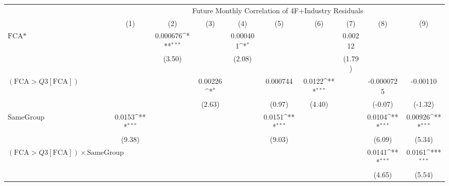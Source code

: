 {
\def\sym#1{\ifmmode^{#1}\else\(^{#1}\)\fi}
\begin{tabular}{l*{9}{c}}
\hline\hline
                &\multicolumn{9}{c}{Future Monthly Correlation of 4F+Industry Residuals}                                                                                                   \\\cmidrule(lr){2-10}
                &\multicolumn{1}{c}{(1)}         &\multicolumn{1}{c}{(2)}         &\multicolumn{1}{c}{(3)}         &\multicolumn{1}{c}{(4)}         &\multicolumn{1}{c}{(5)}         &\multicolumn{1}{c}{(6)}         &\multicolumn{1}{c}{(7)}         &\multicolumn{1}{c}{(8)}         &\multicolumn{1}{c}{(9)}         \\
\hline
$ \text{FCA*} $ &                  & 0.000676\sym{***}&                  & 0.000401\sym{*}  &                  &                  &  0.00212         &                  &                  \\
                &                  &   (3.50)         &                  &   (2.08)         &                  &                  &   (1.79)         &                  &                  \\
[1em]
 $ (\text{FCA} > Q3[\text{FCA}]) $ &                  &                  &  0.00226\sym{*}  &                  & 0.000744         &   0.0122\sym{***}&                  &-0.0000725         & -0.00110         \\
                &                  &                  &   (2.63)         &                  &   (0.97)         &   (4.40)         &                  &  (-0.07)         &  (-1.32)         \\
[1em]
SameGroup       &   0.0153\sym{***}&                  &                  &                  &   0.0151\sym{***}&                  &                  &   0.0104\sym{***}&  0.00926\sym{***}\\
                &   (9.38)         &                  &                  &                  &   (9.03)         &                  &                  &   (6.09)         &   (5.34)         \\
[1em]
 $ (\text{FCA} > Q3[\text{FCA}]) \times  {\text{SameGroup} }  $ &                  &                  &                  &                  &                  &                  &                  &   0.0141\sym{***}&   0.0161\sym{***}\\
                &                  &                  &                  &                  &                  &                  &                  &   (4.65)         &   (5.54)         \\

\end{tabular}}

